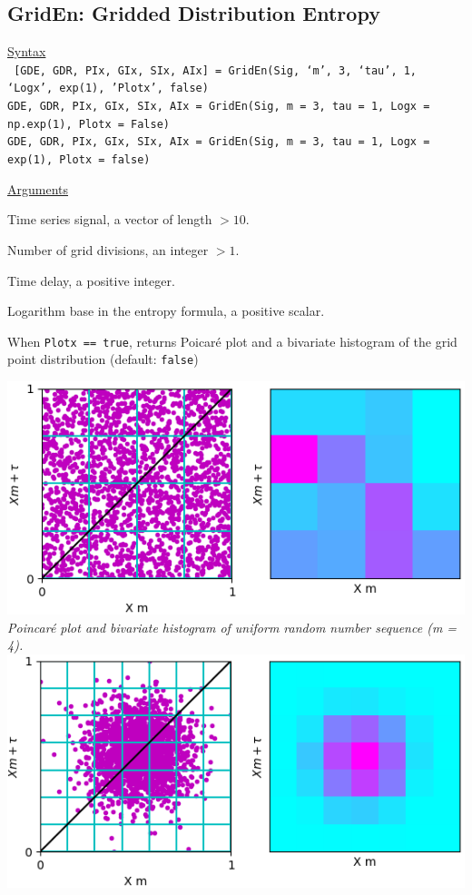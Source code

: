 \documentclass[12pt, a4paper, titlepage, openany]{book}
\begin{document}
\newpage
\subsection{\normalsize GridEn: \hspace{15mm} Gridded Distribution Entropy}
\noindent\ul{Syntax} \vspace{6mm} \\ \noindent \texttt{\footnotesize
[GDE, GDR, PIx, GIx, SIx, AIx]  = GridEn(Sig, ‘m’, 3, ‘tau’, 1, ‘Logx’, exp(1), 'Plotx', false) \\
GDE, GDR, PIx, GIx, SIx, AIx = GridEn(Sig, m = 3, tau = 1, Logx = np.exp(1), Plotx = False) \\
GDE, GDR, PIx, GIx, SIx, AIx = GridEn(Sig, m = 3, tau = 1, Logx = exp(1), Plotx = false)}

\noindent \ul{Arguments}
\begin{description}[labelsep=1cm, labelwidth=2cm, nosep, style=multiline,leftmargin=3cm]\footnotesize
\item[\texttt{Sig}]		Time series signal, a vector of length $> 10$.
\item[\texttt{m}]		Number of grid divisions, an integer $ > 1$.
\item[\texttt{tau}]		Time delay, a positive integer.
\item[\texttt{Logx}]	Logarithm base in the entropy formula, a positive scalar.
\item[\texttt{Plotx}]	When \texttt{Plotx == true}, returns Poicaré plot and a bivariate histogram of the grid point distribution (default: \texttt{false})
\item[ ]			\includegraphics[scale=.5]{Grid1.png}\\
			\textit{Poincaré plot and bivariate histogram of uniform random number sequence (m = 4).\\
					\includegraphics[scale=.5]{Grid2.png}\\
}
\end{description}
\end{document}
